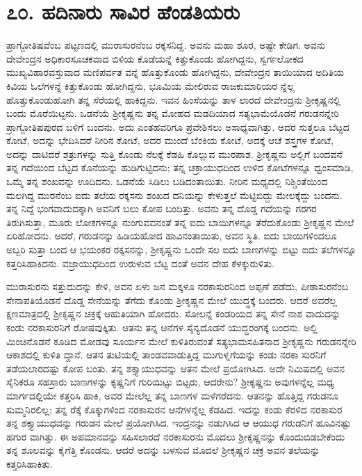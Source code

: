 
\chapter{೭೦. ಹದಿನಾರು ಸಾವಿರ ಹೆಂಡತಿಯರು}

ಪ್ರಾಗ್ಜೋತಿಷವೆಂಬ ಪಟ್ಟಣದಲ್ಲಿ ಮುರಾಸುರನೆಂಬ ರಕ್ಕಸನಿದ್ದ. ಅವನು ಮಹಾ ಶೂರ, ಅಷ್ಟೇ ಕೇಡಿಗ. ಅವನು ದೇವೇಂದ್ರನ ಅಧಿಕಾರಸೂಚಕವಾದ ಬಿಳಿಯ ಕೊಡೆಯನ್ನೆ ಕಿತ್ತುಕೊಂಡು ಹೋಗಿದ್ದನು, ಸ್ವರ್ಗಲೋಕದ ಮುಖ್ಯವಿಹಾರವಸ್ತುವಾದ ಮಣಿಪರ್ವತ ವನ್ನೆ ಹೊತ್ತುಕೊಂಡು ಹೋಗಿದ್ದನು, ದೇವೇಂದ್ರನ ತಾಯಿಯಾದ ಅದಿತಿಯ ಕಿವಿಯ ಓಲೆಗಳನ್ನೆ ಕಿತ್ತುಕೊಂಡು ಹೋಗಿದ್ದನು, ಭೂಮಿಯ ಮೇಲಿರುವ ರಾಜಕುಮಾರಿಯರ ನ್ನೆಲ್ಲ ಹೊತ್ತುಕೊಂಡುಹೋಗಿ ತನ್ನ ಸೆರೆಯಲ್ಲಿ ಹಾಕಿದ್ದನು. ಇವನ ಹಿಂಸೆಯನ್ನು ತಾಳ ಲಾರದೆ ದೇವೇಂದ್ರನು ಶ್ರೀಕೃಷ್ಣನಲ್ಲಿ ಬಂದು ಮೊರೆಯಿಟ್ಟನು. ಒಡನೆಯೆ ಶ್ರೀಕೃಷ್ಣನು ತನ್ನ ಮೋಹದ ಮಡದಿಯಾದ ಸತ್ಯಭಾಮೆಯೊಡನೆ ಗರುಡನನ್ನೇರಿ ಪ್ರಾಗ್ಜೋತಿಷಪುರದ ಬಳಿಗೆ ಬಂದನು. ಅದು ಎಂತಹವರಿಗೂ ಪ್ರವೇಶಿಸಲು ಅಸಾಧ್ಯವಾಗಿತ್ತು. ಅದರ ಸುತ್ತಲೂ ಬೆಟ್ಟದ ಕೋಟೆ, ಅದನ್ನು ಭೇದಿಸಿದರೆ ನೀರಿನ ಕೋಟೆ, ಅದರ ಮುಂದೆ ಬೆಂಕಿಯ ಕೋಟೆ, ಅದಕ್ಕೆ ಆಚೆ ಶಸ್ತ್ರಗಳ ಕೋಟೆ, ಅದನ್ನು ದಾಟಿದರೆ ಶತ್ರುಗಳನ್ನು ಸುತ್ತಿ ಕೊಂಡು ನೆಲಕ್ಕೆ ಕೆಡಹಿ ಕೊಲ್ಲುವ ಮುರಪಾಶ. ಶ್ರೀಕೃಷ್ಣನು ಅಲ್ಲಿಗೆ ಬಂದವನೆ ತನ್ನ ಗದೆಯಿಂದ ಬೆಟ್ಟದ ಕೊನೆಯನ್ನು ಹುಡಿಗುಟ್ಟಿದನು; ತನ್ನ ಚಕ್ರಾಯುಧದಿಂದ ಉಳಿದ ಕೋಟೆಗಳನ್ನೂ ಧ್ವಂಸಮಾಡಿ, ಒಮ್ಮೆ ತನ್ನ ಶಂಖವನ್ನು ಊದಿದನು. ಒಡನೆಯೆ ಸಿಡಿಲು ಬಡಿದಂತಾಯಿತು. ನೀರಿನ ಮಧ್ಯದಲ್ಲಿ ನಿಶ್ಚಿಂತೆಯಿಂದ ಮಲಗಿದ್ದ ಮುರನೆಂಬ ಐದು ತಲೆಯ ರಕ್ಕಸನು ಶಂಖದ ದನಿಯನ್ನು ಕೇಳುತ್ತಲೆ ಮೆಟ್ಟಿಬಿದ್ದು ಮೇಲಕ್ಕೆದ್ದು ಬಂದನು. ತನ್ನ ನಿದ್ದೆ ಭಂಗವಾದುದಕ್ಕಾಗಿ ಅವನಿಗೆ ಬಲು ಕೋಪ ಬಂದಿತ್ತು. ಅವನು ತನ್ನ ದೊಡ್ಡ ಗದೆಯನ್ನು ಗರಗರ ತಿರುಗಿಸುತ್ತಾ, ಮೂರು ಲೋಕಗಳನ್ನೂ ನುಂಗುವವನಂತೆ ತನ್ನ ಐದು ಬಾಯಿಗಳನ್ನೂ ತೆರೆದುಕೊಂಡು ಶ್ರೀಕೃಷ್ಣನ ಮೇಲೆ ಏರಿಹೋದನು. ಆದರೆ, ಗರುಡನನ್ನು ಹಿಡಿಯಹೋದ ಹಾವಿನಂತಾಯಿತು, ಅವನ ಸ್ಥಿತಿ. ಐದು ಬಾಯಿಗಳಿಂದಲೂ ಅಬ್ಬರಿ ಸುತ್ತಾ ಬಂದ ಆ ಭಯಂಕರ ರಕ್ಕಸನನ್ನು, ಶ್ರೀಕೃಷ್ಣನು ಒಂದೇ ಸಲ ಐದು ಬಾಣಗಳನ್ನು ಬಿಟ್ಟು ಐದು ತಲೆಗಳನ್ನೂ ಕತ್ತರಿಸಿಹಾಕಿದನು. ವಜ್ರಾಯುಧದಿಂದ ಉರುಳುವ ಬೆಟ್ಟ ದಂತೆ ಅವನ ದೇಹ ಕೆಳಕ್ಕುರುಳಿತು.

ಮುರಾಸುರನು ಸತ್ತುದುದನ್ನು ಕೇಳಿ, ಅವನ ಏಳು ಜನ ಮಕ್ಕಳೂ ನರಕಾಸುರನಿಂದ ಅಪ್ಪಣೆ ಪಡೆದು, ಪೀಠಾಸುರನೆಂಬ ಸೇನಾಪತಿಯೊಡನೆ ದೊಡ್ಡ ಸೇನೆಯನ್ನು ತೆಗೆದು ಕೊಂಡು ಶ್ರೀಕೃಷ್ಣನ ಮೇಲೆ ಯುದ್ಧಕ್ಕೆ ಬಂದರು. ಆದರೆ ಅವರೆಲ್ಲ ಕ್ಷಣಮಾತ್ರದಲ್ಲಿ ಶ್ರೀಕೃಷ್ಣನ ಚಕ್ರಕ್ಕೆ ಆಹುತಿಯಾಗಿ ಹೋದರು. ಸೋಲನ್ನೆ ಕಂಡರಿಯದ ತನ್ನ ಸೇನೆ ನಾಶ ವಾದುದನ್ನು ಕಂಡು ನರಕಾಸುರನಿಗೆ ರೋಷವುಕ್ಕಿತು. ಆತನು ತನ್ನ ಆನೆಗಳ ಸೈನ್ಯದೊಡನೆ ಯುದ್ಧರಂಗಕ್ಕೆ ಬಂದನು. ಅಲ್ಲಿ ಮಿಂಚಿನೊಡನೆ ಕೂಡಿದ ಮೋಡವು ಸೂರ್ಯನ ಮೇಲೆ ಕುಳಿತಿರುವಂತೆ ಸತ್ಯಭಾಮಸಹಿತನಾದ ಶ್ರೀಕೃಷ್ಣನು ಗರುಡನನ್ನೇರಿ ಆಕಾಶದಲ್ಲಿ ಕುಳಿತಿ ದ್ದಾನೆ. ಆತನ ತುಟಿಯಲ್ಲಿ ತಾಂಡವವಾಡುತ್ತಿದ್ದ ಮುಗುಳ್ನಗೆಯನ್ನು ಕಂಡು ನರಕಾ ಸುರನಿಗೆ ತಡೆಯಲಾರದಷ್ಟು ಕೋಪ ಬಂತು. ತನ್ನ ಶಕ್ತ್ಯಾಯುಧವನ್ನು ಆತನ ಮೇಲೆ ಪ್ರಯೋಗಿಸಿದ. ಅದೇ ನಿಮಿಷದಲ್ಲಿ ಅವನ ಸೈನಿಕರೂ ಸಹಸ್ರಾರು ಬಾಣಗಳನ್ನು ಕೃಷ್ಣನಿಗೆ ಗುರಿಯಿಟ್ಟು ಬಿಟ್ಟರು, ಆದರೇನು? ಶ್ರೀಕೃಷ್ಣನು ಅವುಗಳನ್ನೆಲ್ಲ ಮಧ್ಯ ಮಾರ್ಗದಲ್ಲಿಯೇ ಕತ್ತರಿಸಿ ಹಾಕಿ, ಅವರ ಮೇಲೆಲ್ಲ ತನ್ನ ಬಾಣಗಳ ಮಳೆಗರೆದನು. ಆತನನ್ನು ಹೊತ್ತಿದ್ದ ಗರುಡನೂ ಸುಮ್ಮನಿರಲಿಲ್ಲ; ತನ್ನ ರೆಕ್ಕೆ ಕೊಕ್ಕುಗಳಿಂದ ನರಕಾಸುರನ ಆನೆಗಳನ್ನೆಲ್ಲ ಕೆಡಹಿದ. ಇದನ್ನು ಕಂಡು ಕೆರಳಿದ ನರಕಾಸುರ ತನ್ನ ಶಕ್ತ್ಯಾಯುಧವನ್ನು ಗರುಡನ ಮೇಲೆ ಪ್ರಯೋಗಿಸಿದ. ಇಂದ್ರನನ್ನು ನಡುಗಿಸಿದ ಆ ಆಯುಧ ಗರುಡನಿಗೆ ಹೂವಿನಷ್ಟು ಹಗುರ ವಾಗಿತ್ತು. ಈ ಅಪಮಾನವನ್ನು ಸಹಿಸಲಾರದೆ ನರಕಾಸುರನು ಮೊದಲು ಶ್ರೀಕೃಷ್ಣನನ್ನು ಕೊಂದುಬಿಡಬೇಕೆಂದು ತನ್ನ ಶೂಲವನ್ನು ಕೈಗೆತ್ತಿ ಕೊಂಡನು. ಆದರೆ ಅದನ್ನು ಬಳಸುವ ಮೊದಲೆ ಶ್ರೀಕೃಷ್ಣನ ಚಕ್ರ ಅವನ ತಲೆಯನ್ನು ಕತ್ತರಿಸಿಹಾಕಿತು.

